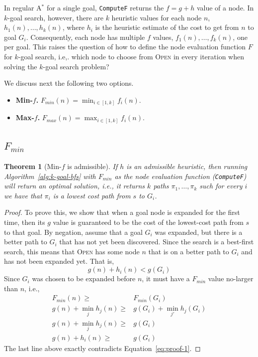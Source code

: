 \documentclass{aicom2e}
\newtheorem{theorem}{Theorem}
\newcommand{\kgs}{$k$-goal search}
\newcommand{\astar}{A$^*$}
\newcommand{\open}{\textsc{Open}}
\begin{document}
In regular \astar{} for a single goal, {\tt ComputeF} returns the $f=g+h$ value of a node. 
In \kgs{}, however, there are $k$ heuristic values for each node $n$, $h_1(n),\ldots,h_k(n)$,  where $h_i$ is the heuristic estimate of the cost to get from $n$ to goal $G_i$.  
Consequently, each node has multiple  $f$ values, $f_1(n),\ldots,f_k(n)$, one per goal. 
This raises the question of how to define the node evaluation function $F$ for \kgs{}, 
i.e,. which node to choose from \open{} in every iteration when solving the \kgs{} problem?


We discuss next the following two options. 
\begin{itemize}
 \item {\bf Min-$f$.} $F_{min}(n)=\min_{i\in [1,k]}f_i(n)$. 
 \item {\bf Max-$f$.} $F_{max}(n)=\max_{i\in [1,k]}f_i(n)$. 
\end{itemize}

\subsection{$F_{min}$}

\begin{theorem}[Min-$f$ is admissible]
If $h$ is an admissible heuristic, then running Algorithm~\ref{alg:k-goal-bfs} with $F_{min}$ 
as the node evaluation function ({\tt ComputeF}) will return an optimal solution, i.e., 
it returns $k$ paths $\pi_1,\ldots, \pi_k$ such for every $i$ we have that $\pi_i$ is a lowest cost path from $s$ to $G_i$. 
\label{the:min-f}
\end{theorem}
 \begin{proof}
To prove this, we show that when a goal node is expanded for the first time, then its $g$ value is guaranteed to 
be the cost of the lowest-cost path from $s$ to that goal. 
By negation, assume that a goal $G_i$ was expanded, but there is a better path to $G_i$
that has not yet been discovered. Since the search is a best-first search, this means
that \open{} has some node $n$ that is on a better path to $G_i$ and has not been expanded yet. 
That is, 
\begin{equation}
g(n)+h_i(n)<g(G_i)
\label{eq:proof-1}
\end{equation}
Since $G_i$ was chosen to be expanded before $n$, it must have a $F_{min}$ value no-larger than $n$, i.e.,
\begin{align}
F_{min}(n) \geq & F_{min}(G_i)\\
g(n)+\min_j h_j(n) \geq & g(G_i)+\min_{j'} h_j(G_i)\\
g(n)+\min_j h_j(n) \geq & g(G_i)\\
g(n)+h_i(n) \geq & g(G_i) 
\end{align}
The last line above exactly contradicts Equation~\ref{eq:proof-1}. 
\end{proof}
\end{document}
